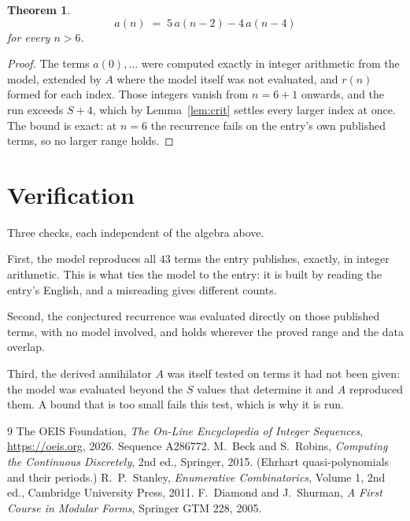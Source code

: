 \documentclass[11pt,a4paper]{article}
\theoremstyle{plain}
\newtheorem{theorem}{Theorem}
\theoremstyle{definition}
\begin{document}
\begin{theorem}
\[
a(n)\;=\;5\,a(n-2) - 4\,a(n-4)
\]
for every $n>6$.
\end{theorem}

\begin{proof}
The terms $a(0),\dots$ were computed exactly in integer arithmetic from the model, extended by
$A$ where the model itself was not evaluated, and $r(n)$ formed for each index. Those integers
vanish from $n=6+1$ onwards, and the run exceeds $S+4$, which by
Lemma~\ref{lem:crit} settles every larger index at once. The bound is exact: at $n=6$ the recurrence fails on the entry's own published terms, so no larger range holds.
\end{proof}

\section{Verification}

Three checks, each independent of the algebra above.

First, the model reproduces all $43$ terms the entry publishes, exactly, in integer
arithmetic. This is what ties the model to the entry: it is built by reading the entry's
English, and a misreading gives different counts.

Second, the conjectured recurrence was evaluated directly on those published terms, with no
model involved, and holds wherever the proved range and the data overlap.

Third, the derived annihilator $A$ was itself tested on terms it had not been given: the model
was evaluated beyond the $S$ values that determine it and $A$ reproduced them. A bound that is
too small fails this test, which is why it is run.

\begin{thebibliography}{9}
 The OEIS Foundation, \emph{The On-Line Encyclopedia of Integer
Sequences}, \url{https://oeis.org}, 2026. Sequence A286772.
 M.~Beck and S.~Robins, \emph{Computing the Continuous Discretely},
2nd ed., Springer, 2015. (Ehrhart quasi-polynomials and their periods.)
 R.~P.~Stanley, \emph{Enumerative Combinatorics}, Volume 1, 2nd ed.,
Cambridge University Press, 2011.
 F.~Diamond and J.~Shurman, \emph{A First Course in Modular Forms},
Springer GTM 228, 2005.
\end{thebibliography}
\end{document}

